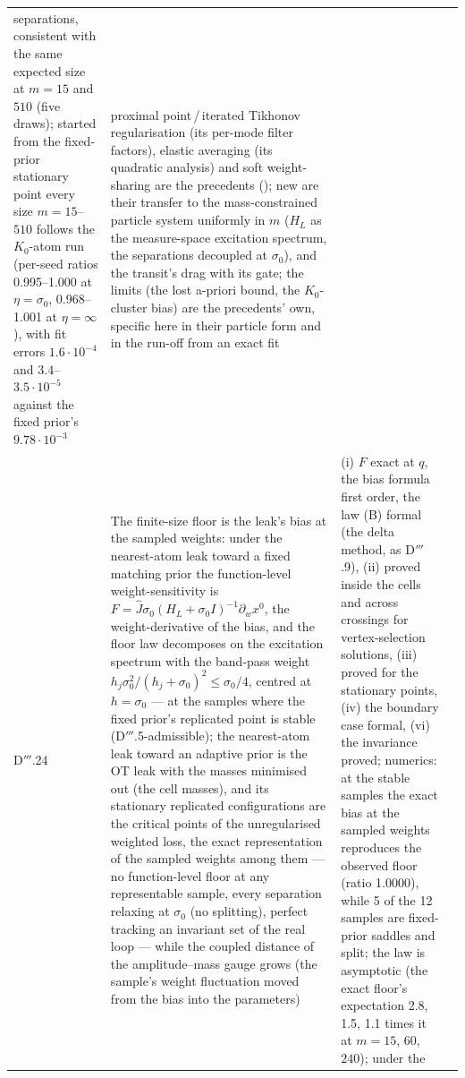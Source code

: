 {\begin{longtable}{@{}>{\raggedright\arraybackslash}p{}>{\raggedright\arraybackslash}p{}%
>{\raggedright\arraybackslash}p{}>{\raggedright\arraybackslash}p{}@{}}
separations, consistent with the same expected size at $m = 15$ and $510$ (five draws); started from the fixed-prior
stationary point every size $m = 15$--$510$ follows the $K_0$-atom run (per-seed ratios 0.995--1.000 at
$\eta = \sigma_0$, 0.968--1.001 at $\eta = \infty$), with fit errors $1.6\cdot10^{-4}$ and $3.4$--$3.5\cdot10^{-5}$
against the fixed prior's $9.78\cdot10^{-3}$
& proximal point\,/\,iterated Tikhonov regularisation (its per-mode filter factors), elastic averaging (its quadratic
analysis) and soft weight-sharing are the precedents (\cite{S49}); new are their transfer to the mass-constrained
particle system uniformly in $m$ ($H_L$ as the measure-space excitation spectrum, the separations decoupled at
$\sigma_0$), and the transit's drag with its gate; the limits (the lost a-priori bound, the $K_0$-cluster bias) are
the precedents' own, specific here in their particle form and in the run-off from an exact fit\\
\addlinespace[0.5pt]
D$'''$.24 & The finite-size floor is the leak's bias at the sampled weights: under the nearest-atom leak toward a
fixed matching prior the function-level weight-sensitivity is $F = \hat J\sigma_0(H_L + \sigma_0I)^{-1}\partial_wx^0$,
the weight-derivative of the bias, and the floor law decomposes on the excitation spectrum with the band-pass weight
$h_j\sigma_0^2/(h_j + \sigma_0)^2\le\sigma_0/4$, centred at $h = \sigma_0$ --- at the samples where the fixed prior's
replicated point is stable (D$'''$.5-admissible); the nearest-atom leak toward an adaptive prior is the OT leak with
the masses minimised out (the cell masses), and its stationary replicated configurations are the critical points of
the unregularised weighted loss, the exact representation of the sampled weights among them --- no function-level
floor at any representable sample, every separation relaxing at $\sigma_0$ (no splitting), perfect tracking an
invariant set of the real loop --- while the coupled distance of the amplitude--mass gauge grows (the sample's weight
fluctuation moved from the bias into the parameters)
& (i) $F$ exact at $q$, the bias formula first order, the law (B) formal (the delta method, as D$'''$.9), (ii) proved
inside the cells and across crossings for vertex-selection solutions, (iii) proved for the stationary points, (iv)
the boundary case formal, (vi) the invariance proved; numerics: at the stable samples the exact bias at the sampled
weights reproduces the observed floor (ratio 1.0000), while 5 of the 12 samples are fixed-prior saddles and split;
the law is asymptotic (the exact floor's expectation 2.8, 1.5, 1.1 times it at $m = 15$, $60$, $240$); under the

\end{longtable}}
